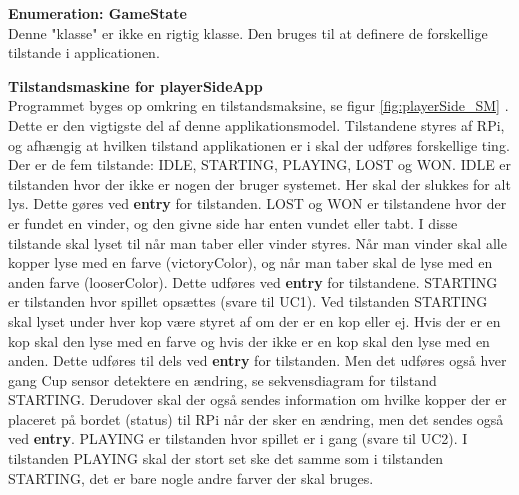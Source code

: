 \documentclass[Arkitektur/System_main.tex]{subfiles}
\begin{document}
\textbf{Enumeration:  GameState}\\
Denne "klasse" er ikke en rigtig klasse. Den bruges til at definere de forskellige tilstande i applicationen. 


\textbf{Tilstandsmaskine for playerSideApp}\\
Programmet byges op omkring en tilstandsmaksine, se figur \ref{fig:playerSide_SM} . Dette er den vigtigste del af denne applikationsmodel. Tilstandene styres af RPi, og afhængig at hvilken tilstand applikationen er i skal der udføres forskellige ting. Der er de fem tilstande: IDLE, STARTING, PLAYING, LOST og WON. IDLE er tilstanden hvor der ikke er nogen der bruger systemet. Her skal der slukkes for alt lys. Dette gøres ved \textbf{entry} for tilstanden. LOST og WON er tilstandene hvor der er fundet en vinder, og den givne side har enten vundet eller tabt. I disse tilstande skal lyset til når man taber eller vinder styres. Når man vinder skal alle kopper lyse med en farve (victoryColor), og når man taber skal de lyse med en anden farve (looserColor). Dette udføres ved \textbf{entry} for tilstandene. STARTING er tilstanden hvor spillet opsættes (svare til UC1). Ved tilstanden STARTING skal lyset under hver kop være styret af om der er en kop eller ej. Hvis der er en kop skal den lyse med en farve og hvis der ikke er en kop skal den lyse med en anden. Dette udføres til dels ved \textbf{entry} for tilstanden. Men det udføres også hver gang Cup sensor detektere en ændring, se sekvensdiagram for tilstand STARTING. Derudover skal der også sendes information om hvilke kopper der er placeret på bordet (status) til RPi når der sker en ændring, men det sendes også ved \textbf{entry}.
PLAYING er tilstanden hvor spillet er i gang (svare til UC2). I tilstanden PLAYING skal der stort set ske det samme som i tilstanden STARTING, det er bare nogle andre farver der skal bruges. 
\end{document}
